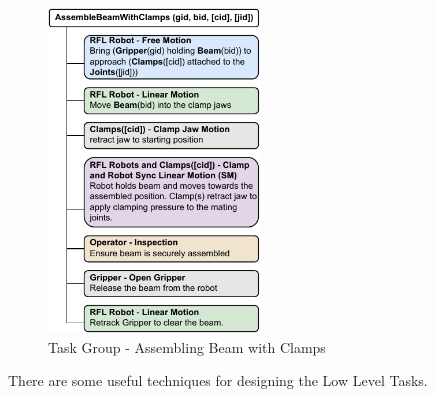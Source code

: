 \begin{figure}[!p]
    \centering
    \includegraphics[width=0.50\textwidth]{images/6a/lowleveltask-5.pdf}
    \caption{Task Group - Assembling Beam with Clamps}
    \label{fig:task-group-5}
\end{figure}

There are some useful techniques for designing the Low Level Tasks.

